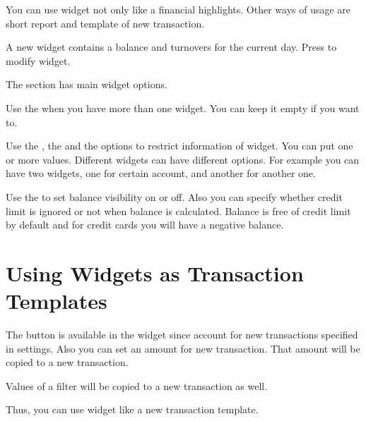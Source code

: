 \documentclass[a4paper,10pt,english]{sphinxmanual}
\begin{document}
You can use widget not only like a financial highlights. Other ways of usage are short report
and template of new transaction.

\noindent{}

\noindent{}

\noindent{}

A new widget contains a balance and turnovers for the current day. Press 
to modify widget.

The  section has main widget options.

Use the  when you have more than one widget. You can keep it empty if you want to.

Use the , the  and the  options
to restrict information of widget. You can put one or more values. Different widgets
can have different options. For example you can have two widgets, one for
certain account, and another for another one.

Use the  to set balance visibility on or off. Also you can specify
whether credit limit is ignored or not when balance is calculated.
Balance is free of credit limit by default and for credit cards
you will have a negative balance.

\noindent{}

\noindent{}


\section{Using Widgets as Transaction Templates}
\label{\detokenize{widgets:using-widgets-as-transaction-templates}}
The  button is available in the widget since account for new transactions specified in
settings. Also you can set an amount for new transaction. That amount will be copied to a new transaction.

Values of a filter will be copied to a new transaction as well.

Thus, you can use widget like a new transaction template.
\end{document}

